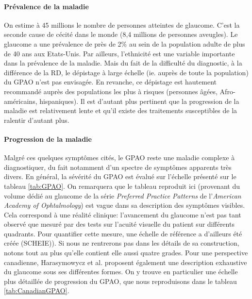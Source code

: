 \paragraph{Prévalence de la maladie} 
On estime à 45 millions le nombre de personnes atteintes de glaucome. C'est la seconde cause de cécité dans le monde (8,4 millions de personnes aveugles). Le glaucome a une prévalence de près de 2\% au sein de la population adulte de plus de 40 ans aux Etats-Unis. Par ailleurs, l'ethnicité est une variable importante dans la prévalence de la maladie.
Mais du fait de la difficulté du diagnostic, à la différence de la \ac{RD}, le dépistage à large échelle (ie. auprès de toute la population) du \ac{GPAO} n'est pas envisagée. En revanche, ce dépistage est hautement recommandé auprès des populations les plus à risques (personnes âgées, Afro-américains, hispaniques). Il est d'autant plus pertinent que la progression de la maladie est relativement lente et qu'il existe des traitements susceptibles de la ralentir d'autant plus. 

\paragraph{Progression de la maladie} Malgré ces quelques symptômes cités, le \ac{GPAO} reste une maladie complexe à diagnostiquer, du fait notamment d'un spectre de symptômes apparents très divers. En général, la sévérité du \ac{GPAO} est évalué sur l'échelle présenté sur le tableau \ref{tab:GPAO}. On remarquera que le tableau reproduit ici (provenant du volume dédié au glaucome de la série \textit{Preferred Practice Patterns} de l'\textit{American Academy of Ophtalmology}) est vague dans sa description des symptômes visibles. Cela correspond à une réalité clinique: l'avancement du glaucome n'est pas tant observé que mesuré par des tests sur l'acuité visuelle du patient sur différents quadrants. Pour quantifier cette mesure, une échelle de référence a d'ailleurs été créée (\ac{SCHEIE})). Si nous ne rentrerons pas dans les détails de sa construction, notons tout au plus qu'elle contient elle aussi quatre grades. 
Pour une perspective canadienne, Harasymowycz et al.\cite{harasymowyczMedicalManagementGlaucoma2016} proposent également une description exhaustive du glaucome sous ses différentes formes. On y trouve en particulier une échelle plus détaillée de progression du \ac{GPAO}, que nous reproduisons dans le tableau \ref{tab:CanadianGPAO}.


